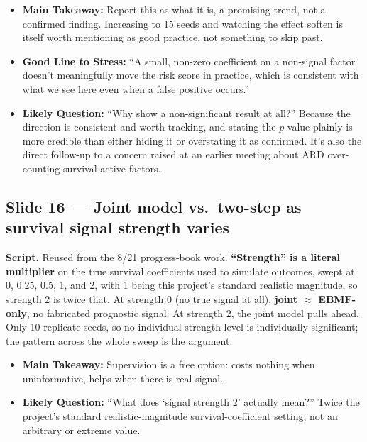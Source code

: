 \documentclass[11pt]{article}
\newcommand{\scriptlabel}{\textbf{Script. }}
\newcommand{\sectionlabel}[1]{\textbf{#1}}
\newcommand{\key}[1]{\textcolor{keyblue}{\textbf{#1}}}        %
\begin{document}
\begin{itemize}
\item \sectionlabel{Main Takeaway:} Report this as what it is, a promising trend, not a confirmed
finding. Increasing to 15 seeds and watching the effect soften is itself worth mentioning as good
practice, not something to skip past.
\item \sectionlabel{Good Line to Stress:} ``A small, non-zero coefficient on a non-signal factor
doesn't meaningfully move the risk score in practice, which is consistent with what we see here even
when a false positive occurs.''
\item \sectionlabel{Likely Question:} ``Why show a non-significant result at all?'' Because the
direction is consistent and worth tracking, and stating the $p$-value plainly is more credible than
either hiding it or overstating it as confirmed. It's also the direct follow-up to a concern raised
at an earlier meeting about ARD over-counting survival-active factors.
\end{itemize}

\subsection*{Slide 16 --- Joint model vs.\ two-step as survival signal strength varies}
\scriptlabel Reused from the 8/21 progress-book work. \key{``Strength'' is a literal multiplier} on
the true survival coefficients used to simulate outcomes, swept at 0, 0.25, 0.5, 1, and 2, with 1
being this project's standard realistic magnitude, so strength 2 is twice that. At strength 0 (no
true signal at all), \key{joint $\approx$ EBMF-only}, no fabricated prognostic signal. At strength 2,
the joint model pulls ahead. Only 10 replicate seeds, so no individual strength level is
individually significant; the pattern across the whole sweep is the argument.

\begin{itemize}
\item \sectionlabel{Main Takeaway:} Supervision is a free option: costs nothing when uninformative,
helps when there is real signal.
\item \sectionlabel{Likely Question:} ``What does `signal strength 2' actually mean?'' Twice the
project's standard realistic-magnitude survival-coefficient setting, not an arbitrary or extreme
value.
\end{itemize}
\end{document}
